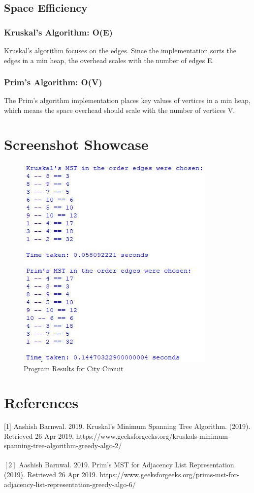 \documentclass{article}
\begin{document}
\subsection{Space Efficiency}
\subsubsection[Kruskal's Algorithm]{Kruskal's Algorithm: O(E)}
Kruskal's algorithm focuses on the edges. Since the implementation sorts the edges in a min heap, the overhead scales with the number of edges E.
\subsubsection[Prim's Algorithm]{Prim's Algorithm: O(V)}
The Prim's algorithm implementation places key values of vertices in a min heap, which means the space overhead should scale with the number of vertices V.

\newpage
\section{Screenshot Showcase}
\begin{figure}[H]
    \centering
    \includegraphics{mst.JPG}
    \caption{Program Results for City Circuit}
\end{figure}

\newpage
\section{References}
[1] Aashish Barnwal. 2019. Kruskal’s Minimum Spanning Tree Algorithm. (2019). Retrieved 26 Apr 2019. https://www.geeksforgeeks.org/kruskals-minimum-spanning-tree-algorithm-greedy-algo-2/ \\ \\
$[2]$ Aashish Barnwal. 2019. Prim’s MST for Adjacency List Representation. (2019). Retrieved 26 Apr 2019. https://www.geeksforgeeks.org/prims-mst-for-adjacency-list-representation-greedy-algo-6/
\end{document}
